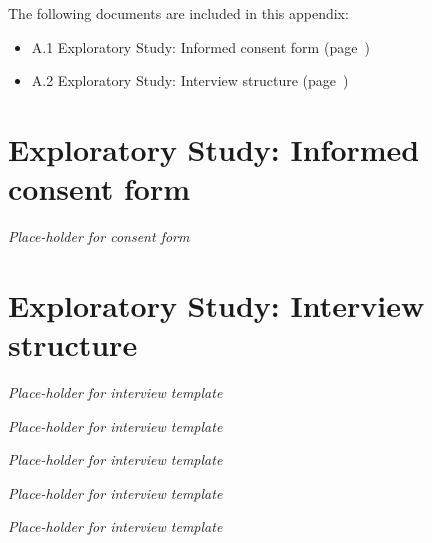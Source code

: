 
The following documents are included in this appendix:

\begin{itemize}
\item A.1 Exploratory Study: Informed consent form (page~\pageref{chap:appendices-exploratory-study-material:consent})
\item A.2 Exploratory Study: Interview structure (page~\pageref{chap:appendices-exploratory-study-material:template})
\end{itemize}

\newpage
\section{Exploratory Study: Informed consent form}
\label{chap:appendices-exploratory-study-material:consent}
\Huge
\textit{Place-holder for consent form}
\normalsize

\newpage
\section{Exploratory Study: Interview structure}
\label{chap:appendices-exploratory-study-material:template}
\Huge
\textit{Place-holder for interview template}
\normalsize

\newpage
\Huge
\textit{Place-holder for interview template}
\normalsize

\newpage
\Huge
\textit{Place-holder for interview template}
\normalsize

\newpage
\Huge
\textit{Place-holder for interview template}
\normalsize

\newpage
\Huge
\textit{Place-holder for interview template}
\normalsize

